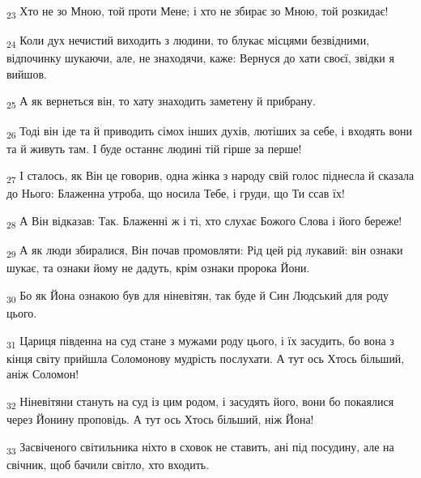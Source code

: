 \begin{tcolorbox}
\textsubscript{23} Хто не зо Мною, той проти Мене; і хто не збирає зо Мною, той розкидає!
\end{tcolorbox}
\begin{tcolorbox}
\textsubscript{24} Коли дух нечистий виходить з людини, то блукає місцями безвідними, відпочинку шукаючи, але, не знаходячи, каже: Вернуся до хати своєї, звідки я вийшов.
\end{tcolorbox}
\begin{tcolorbox}
\textsubscript{25} А як вернеться він, то хату знаходить заметену й прибрану.
\end{tcolorbox}
\begin{tcolorbox}
\textsubscript{26} Тоді він іде та й приводить сімох інших духів, лютіших за себе, і входять вони та й живуть там. І буде останнє людині тій гірше за перше!
\end{tcolorbox}
\begin{tcolorbox}
\textsubscript{27} І сталось, як Він це говорив, одна жінка з народу свій голос піднесла й сказала до Нього: Блаженна утроба, що носила Тебе, і груди, що Ти ссав їх!
\end{tcolorbox}
\begin{tcolorbox}
\textsubscript{28} А Він відказав: Так. Блаженні ж і ті, хто слухає Божого Слова і його береже!
\end{tcolorbox}
\begin{tcolorbox}
\textsubscript{29} А як люди збиралися, Він почав промовляти: Рід цей рід лукавий: він ознаки шукає, та ознаки йому не дадуть, крім ознаки пророка Йони.
\end{tcolorbox}
\begin{tcolorbox}
\textsubscript{30} Бо як Йона ознакою був для ніневітян, так буде й Син Людський для роду цього.
\end{tcolorbox}
\begin{tcolorbox}
\textsubscript{31} Цариця південна на суд стане з мужами роду цього, і їх засудить, бо вона з кінця світу прийшла Соломонову мудрість послухати. А тут ось Хтось більший, аніж Соломон!
\end{tcolorbox}
\begin{tcolorbox}
\textsubscript{32} Ніневітяни стануть на суд із цим родом, і засудять його, вони бо покаялися через Йонину проповідь. А тут ось Хтось більший, ніж Йона!
\end{tcolorbox}
\begin{tcolorbox}
\textsubscript{33} Засвіченого світильника ніхто в сховок не ставить, ані під посудину, але на свічник, щоб бачили світло, хто входить.
\end{tcolorbox}
